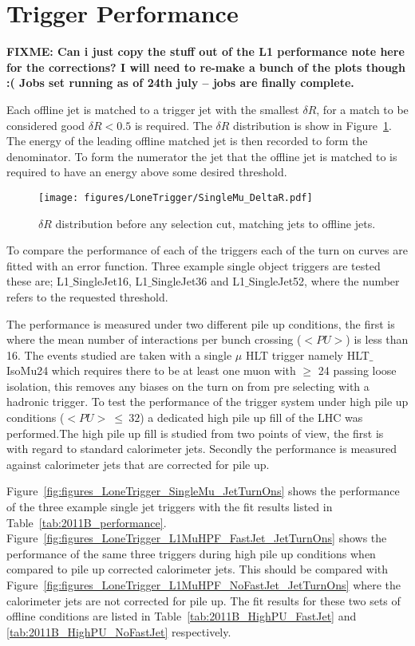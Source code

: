 \section{\Lone Trigger Performance} %
\label{sec:lone_trigger_performance}
\textbf{FIXME: Can i just copy the stuff out of the L1 performance note here 
for the corrections? I will need to re-make a bunch of the plots though :( Jobs 
set running as of 24th july -- jobs are finally complete.}


Each offline jet is matched to a \Lone trigger jet with the smallest $\delta 
R$, for a match to be considered good $\delta R < 0.5$ is required. The $\delta 
R$ distribution is show in Figure~\ref{fig:figures_LoneTrigger_SingleMu_DeltaR}.
The energy of the leading offline matched jet is then recorded to form the 
denominator. To form the numerator the \Lone jet that the offline jet is 
matched to is required to have an energy above some desired threshold.

\begin{figure}[ht!]
  \centering
    \texttt{[image: figures/LoneTrigger/SingleMu\_DeltaR.pdf]}
  \caption{$\delta R$ distribution before any selection cut, matching \Lone 
  jets to offline jets.}
  \label{fig:figures_LoneTrigger_SingleMu_DeltaR}
\end{figure}


To compare the performance of each of the triggers each of the turn on curves
are fitted with an error function. Three example single object triggers are 
tested these are; L1$\_$SingleJet16, L1$\_$SingleJet36 and L1$\_$SingleJet52, 
where the number refers to the requested \ET threshold.

The performance is measured under two different pile up conditions, the first
is where the mean number of interactions per bunch crossing ($<PU>$) is less 
than 16. The events studied are taken with a single $\mu$ HLT trigger namely
HLT$\_$IsoMu24 which requires there to be at least one muon with \PT $\geq$ 24 
\GeV passing loose isolation, this removes any biases on the turn on from pre 
selecting with a hadronic trigger. To test the performance of the trigger 
system under high pile up conditions ($<PU> ~ \leq ~ 32$) a dedicated high pile 
up fill of the LHC was performed.The high pile up fill is studied from two 
points of view, the first is with regard to standard \AK calorimeter jets. 
Secondly the performance is measured against \AK calorimeter jets that are 
corrected for pile up.

Figure~\ref{fig:figures_LoneTrigger_SingleMu_JetTurnOns} shows the performance 
of the three example \Lone single jet triggers with the fit results listed in 
Table~\ref{tab:2011B_performance}.
Figure~\ref{fig:figures_LoneTrigger_L1MuHPF_FastJet_JetTurnOns} shows the 
performance of the same three triggers during high pile up conditions when 
compared to pile up corrected \AK calorimeter jets. This should be compared with
Figure~\ref{fig:figures_LoneTrigger_L1MuHPF_NoFastJet_JetTurnOns} where the \AK
calorimeter jets are not corrected for pile up. The fit results for these two
sets of offline conditions are listed in Table~\ref{tab:2011B_HighPU_FastJet} 
and \ref{tab:2011B_HighPU_NoFastJet} respectively.


